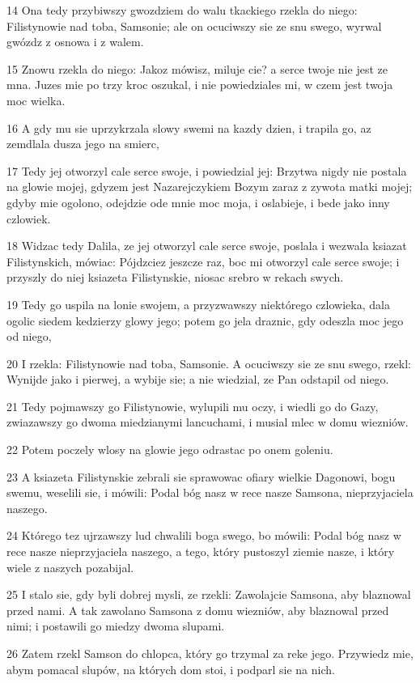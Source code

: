 \par 14 Ona tedy przybiwszy gwozdziem do walu tkackiego rzekla do niego: Filistynowie nad toba, Samsonie; ale on ocuciwszy sie ze snu swego, wyrwal gwózdz z osnowa i z walem.
\par 15 Znowu rzekla do niego: Jakoz mówisz, miluje cie? a serce twoje nie jest ze mna. Juzes mie po trzy kroc oszukal, i nie powiedziales mi, w czem jest twoja moc wielka.
\par 16 A gdy mu sie uprzykrzala slowy swemi na kazdy dzien, i trapila go, az zemdlala dusza jego na smierc,
\par 17 Tedy jej otworzyl cale serce swoje, i powiedzial jej: Brzytwa nigdy nie postala na glowie mojej, gdyzem jest Nazarejczykiem Bozym zaraz z zywota matki mojej; gdyby mie ogolono, odejdzie ode mnie moc moja, i oslabieje, i bede jako inny czlowiek.
\par 18 Widzac tedy Dalila, ze jej otworzyl cale serce swoje, poslala i wezwala ksiazat Filistynskich, mówiac: Pójdzciez jeszcze raz, boc mi otworzyl cale serce swoje; i przyszly do niej ksiazeta Filistynskie, niosac srebro w rekach swych.
\par 19 Tedy go uspila na lonie swojem, a przyzwawszy niektórego czlowieka, dala ogolic siedem kedzierzy glowy jego; potem go jela draznic, gdy odeszla moc jego od niego,
\par 20 I rzekla: Filistynowie nad toba, Samsonie. A ocuciwszy sie ze snu swego, rzekl: Wynijde jako i pierwej, a wybije sie; a nie wiedzial, ze Pan odstapil od niego.
\par 21 Tedy pojmawszy go Filistynowie, wylupili mu oczy, i wiedli go do Gazy, zwiazawszy go dwoma miedzianymi lancuchami, i musial mlec w domu wiezniów.
\par 22 Potem poczely wlosy na glowie jego odrastac po onem goleniu.
\par 23 A ksiazeta Filistynskie zebrali sie sprawowac ofiary wielkie Dagonowi, bogu swemu, weselili sie, i mówili: Podal bóg nasz w rece nasze Samsona, nieprzyjaciela naszego.
\par 24 Którego tez ujrzawszy lud chwalili boga swego, bo mówili: Podal bóg nasz w rece nasze nieprzyjaciela naszego, a tego, który pustoszyl ziemie nasze, i który wiele z naszych pozabijal.
\par 25 I stalo sie, gdy byli dobrej mysli, ze rzekli: Zawolajcie Samsona, aby blaznowal przed nami. A tak zawolano Samsona z domu wiezniów, aby blaznowal przed nimi; i postawili go miedzy dwoma slupami.
\par 26 Zatem rzekl Samson do chlopca, który go trzymal za reke jego. Przywiedz mie, abym pomacal slupów, na których dom stoi, i podparl sie na nich.
